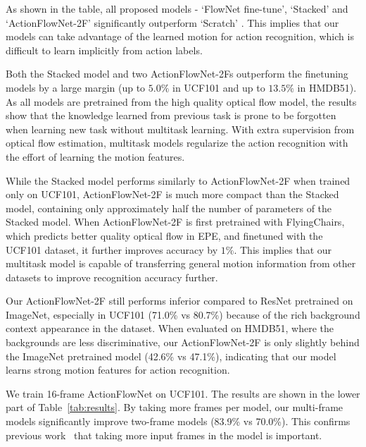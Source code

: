 \documentclass[10pt,twocolumn,letterpaper]{article}
\begin{document}
As shown in the table, all proposed models - `FlowNet fine-tune', `Stacked' and `ActionFlowNet-2F' significantly outperform `Scratch' .
This implies that our models can take advantage of the learned motion for action recognition, which is difficult to learn implicitly from action labels.

Both the Stacked model and two ActionFlowNet-2Fs outperform the finetuning models by a large margin (up to $5.0\%$ in UCF101 and up to $13.5\%$ in HMDB51).
As all models are pretrained from the high quality optical flow model, the results show that the knowledge learned from previous task is prone to be forgotten when learning new task without multitask learning.
With extra supervision from optical flow estimation, multitask models regularize the action recognition with the effort of learning the motion features.

While the Stacked model performs similarly to ActionFlowNet-2F when trained only on UCF101, ActionFlowNet-2F is much more compact than the Stacked model, containing only approximately half the number of parameters of the Stacked model.
When ActionFlowNet-2F is first pretrained with FlyingChairs, which predicts better quality optical flow in EPE, and finetuned with the UCF101 dataset, it further improves accuracy by $1\%$.
This implies that our multitask model is capable of transferring general motion information from other datasets to improve recognition accuracy further.

Our ActionFlowNet-2F still performs inferior compared to ResNet pretrained on ImageNet, especially in UCF101 (71.0\% vs 80.7\%) because of the rich background context appearance in the dataset. When evaluated on HMDB51, where the backgrounds are less discriminative, our ActionFlowNet-2F is only slightly behind the ImageNet pretrained model (42.6\% vs 47.1\%), indicating that our model learns strong motion features for action recognition. 

We train 16-frame ActionFlowNet on UCF101. The results are shown in the lower part of Table~\ref{tab:results}. By taking more frames per model, our multi-frame models significantly improve two-frame models (83.9\% vs 70.0\%). This confirms previous work~\cite{karpathyTSLSF14,ngHVVMT15} that taking more input frames in the model is important.
\end{document}
